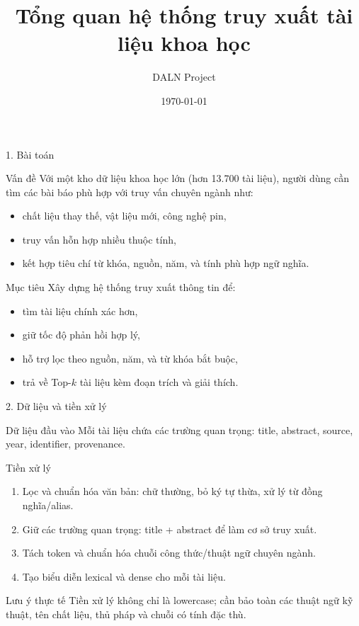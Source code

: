 \documentclass[aspectratio=169]{beamer}
\title[Tổng quan hệ thống truy xuất tài liệu]{Tổng quan hệ thống truy xuất tài liệu khoa học}
\author{DALN Project}
\date{\today}
\begin{document}
\begin{frame}
  \titlepage
\end{frame}

\begin{frame}{1. Bài toán}
  \begin{block}{Vấn đề}
    Với một kho dữ liệu khoa học lớn (hơn 13.700 tài liệu), người dùng cần tìm các bài báo phù hợp với truy vấn chuyên ngành như:
    \begin{itemize}
      \item chất liệu thay thế, vật liệu mới, công nghệ pin,\
      \item truy vấn hỗn hợp nhiều thuộc tính,\
      \item kết hợp tiêu chí từ khóa, nguồn, năm, và tính phù hợp ngữ nghĩa.
    \end{itemize}
  \end{block}

  \vspace{0.3cm}
  \begin{block}{Mục tiêu}
    Xây dựng hệ thống truy xuất thông tin để:
    \begin{itemize}
      \item tìm tài liệu chính xác hơn,\
      \item giữ tốc độ phản hồi hợp lý,\
      \item hỗ trợ lọc theo nguồn, năm, và từ khóa bắt buộc,\
      \item trả về Top-$k$ tài liệu kèm đoạn trích và giải thích.
    \end{itemize}
  \end{block}
\end{frame}

\begin{frame}{2. Dữ liệu và tiền xử lý}
  \begin{block}{Dữ liệu đầu vào}
    Mỗi tài liệu chứa các trường quan trọng: title, abstract, source, year, identifier, provenance.
  \end{block}

  \vspace{0.2cm}
  \begin{block}{Tiền xử lý}
    \begin{enumerate}
      \item Lọc và chuẩn hóa văn bản: chữ thường, bỏ ký tự thừa, xử lý từ đồng nghĩa/alias.\
      \item Giữ các trường quan trọng: title + abstract để làm cơ sở truy xuất.\
      \item Tách token và chuẩn hóa chuỗi công thức/thuật ngữ chuyên ngành.\
      \item Tạo biểu diễn lexical và dense cho mỗi tài liệu.\
    \end{enumerate}
  \end{block}

  \vspace{0.2cm}
  \begin{alertblock}{Lưu ý thực tế}
    Tiền xử lý không chỉ là lowercase; cần bảo toàn các thuật ngữ kỹ thuật, tên chất liệu, thủ pháp và chuỗi có tính đặc thù.
  \end{alertblock}
\end{frame}
\end{document}
